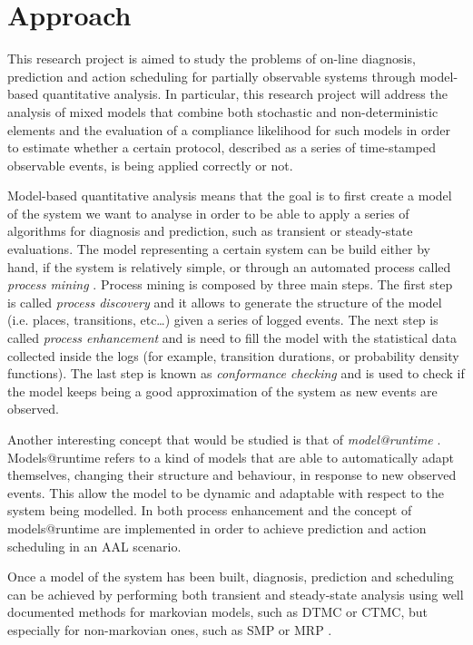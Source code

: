 \documentclass{article}
\begin{document}
    \section*{Approach}
        
        This research project is aimed to study the problems of on-line diagnosis, prediction and action scheduling for partially observable systems through model-based quantitative analysis. In particular, this research project will address the analysis of mixed models that combine both stochastic and non-deterministic elements and the evaluation of a compliance likelihood for such models in order to estimate whether a certain protocol, described as a series of time-stamped observable events, is being applied correctly or not.
        
        Model-based quantitative analysis means that the goal is to first create a model of the system we want to analyse in order to be able to apply a series of algorithms for diagnosis and prediction, such as transient or steady-state evaluations. The model representing a certain system can be build either by hand, if the system is relatively simple, or through an automated process called \textit{process mining} \cite{van2004workflow}. Process mining is composed by three main steps. The first step is called \textit{process discovery} and it allows to generate the structure of the model (i.e. places, transitions, etc\dots) given a series of logged events. The next step is called \textit{process enhancement} and is need to fill the model with the statistical data collected inside the logs (for example, transition durations, or probability density functions). The last step is known as \textit{conformance checking} and is used to check if the model keeps being a good approximation of the system as new events are observed.
        
        Another interesting concept that would be studied is that of \textit{model@runtime} \cite{blair2009models}. Models@runtime refers to a kind of models that are able to automatically adapt themselves, changing their structure and behaviour, in response to new observed events. This allow the model to be dynamic and adaptable with respect to the system being modelled. In \cite{epew16} both process enhancement and the concept of models@runtime are implemented in order to achieve prediction and action scheduling in an AAL scenario.
        
        Once a model of the system has been built, diagnosis, prediction and scheduling can be achieved by performing both transient and steady-state analysis using well documented methods for markovian models, such as DTMC or CTMC, but especially for non-markovian ones, such as SMP or MRP \cite{horvath2012transient, mascots16}.
        
\end{document}
